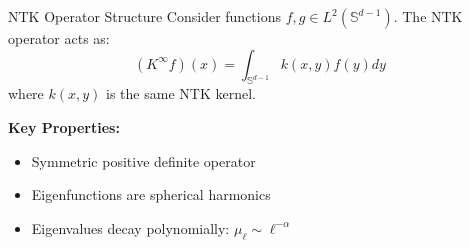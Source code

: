 \documentclass{beamer}
\newcommand{\Kinf}{K^{\infty}}
\newcommand{\Sd}{\mathbb{S}^{d-1}}
\begin{document}
\begin{frame}{NTK Operator Structure}
Consider functions $f,g \in L^2(\Sd)$. The NTK operator acts as:
\[
(\Kinf f)(x) = \int_{\Sd} k(x,y)f(y)dy
\]
where $k(x,y)$ is the same NTK kernel.

\textbf{Key Properties:}
\begin{itemize}
\item Symmetric positive definite operator
\item Eigenfunctions are spherical harmonics
\item Eigenvalues decay polynomially: $\mu_\ell \sim \ell^{-\alpha}$
\end{itemize}
\end{frame}
\end{document}
